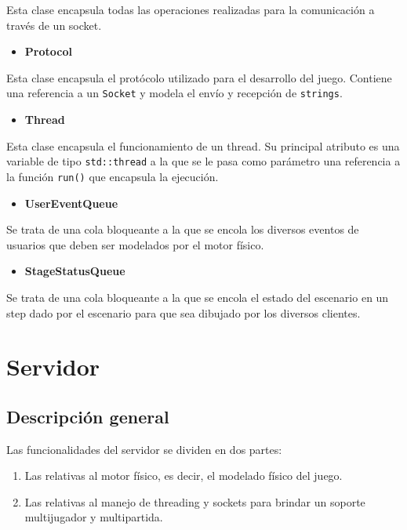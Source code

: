 \documentclass[a4paper]{article}
\begin{document}
Esta clase encapsula todas las operaciones realizadas para la comunicación a través de un socket.

\begin{itemize}
	\item \textbf{Protocol}
\end{itemize}

Esta clase encapsula el protócolo utilizado para el desarrollo del juego. Contiene una referencia a un \texttt{Socket} y modela el envío y recepción de \texttt{strings}.

\begin{itemize}
	\item \textbf{Thread}
\end{itemize}

Esta clase encapsula el funcionamiento de un thread. Su principal atributo es una variable de tipo \texttt{std::thread} a la que se le pasa como parámetro una
referencia a la función \texttt{run()} que encapsula la ejecución.

\begin{itemize}
	\item \textbf{UserEventQueue}
\end{itemize}

Se trata de una cola bloqueante a la que se encola los diversos eventos de usuarios que deben ser modelados por el motor físico.

\begin{itemize}
	\item \textbf{StageStatusQueue}
\end{itemize}

Se trata de una cola bloqueante a la que se encola el estado del escenario en un step dado por el escenario para que sea dibujado por los diversos clientes.

\section{Servidor}

\subsection{Descripción general}
Las funcionalidades del servidor se dividen en dos partes:
\begin{enumerate}
	\item Las relativas al motor físico, es decir, el modelado físico del juego.
	\item Las relativas al manejo de threading y sockets para brindar un soporte multijugador y multipartida.
\end{enumerate}
\end{document}
